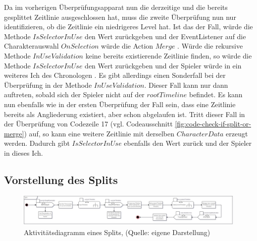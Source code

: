 Da im vorherigen Überprüfungsapparat nun die derzeitige und die bereits gesplittet Zeitlinie ausgeschlossen hat, muss die zweite Überprüfung nun nur identifizieren, ob die Zeitlinie ein niedrigeres Level hat. Ist das der Fall, würde die Methode $IsSelectorInUse$ den Wert  zurückgeben und der EventListener auf die Charakterauswahl $OnSelection$ würde die Action $Merge$ . Würde die rekursive Methode $InUseValidation$ keine bereits existierende Zeitlinie finden, so würde die Methode $IsSelectorInUse$ den Wert  zurückgeben und der Spieler würde in ein weiteres Ich des Chronologen . Es gibt allerdings einen Sonderfall bei der Überprüfung in der Methode $InUseValidation$. Dieser Fall kann nur dann auftreten, sobald sich der Spieler nicht auf der $rootTimeline$ befindet. Es kann nun ebenfalls wie in der ersten Überprüfung der Fall sein, dass eine Zeitlinie bereits als Angliederung existiert, aber schon abgelaufen ist. Tritt dieser Fall in der Überprüfung von Codezeile 17 (vgl. Codeausschnitt \ref{fig:code-check-if-split-or-merge}) auf, so kann eine weitere Zeitlinie mit derselben $CharacterData$ erzeugt werden. Dadurch gibt $IsSelectorInUse$ ebenfalls den Wert  zurück und der Spieler  in dieses Ich.

\subsection{Vorstellung des Splits}\label{sec:split_prototype}

\begin{figure}[ht]
\centering
\includegraphics[width=1\linewidth]{content/pictures/Split_uml.jpg}
\caption{Aktivitätsdiagramm eines Splits, (Quelle: eigene Darstellung)}
\label{fig:split-uml}
\end{figure}

